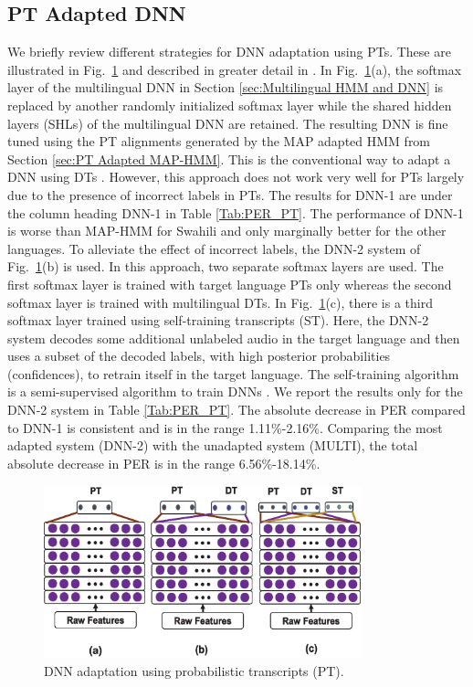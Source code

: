 \documentclass[a4paper]{article}
\newcommand{\myvspacefig}{\vspace{-4mm}}
\begin{document}
\subsection{PT Adapted DNN}
\label{sec:PT Adapted DNN}
We briefly review different strategies for DNN adaptation using PTs. These are illustrated in Fig.~\ref{fig:DNN} and described in greater detail in \cite{Das-PTAdaptedDNN}. In Fig.~\ref{fig:DNN}(a), the softmax layer of the multilingual DNN in Section \ref{sec:Multilingual HMM and DNN} is replaced by another randomly initialized softmax layer while the shared hidden layers (SHLs) of the multilingual DNN are retained. The resulting DNN is fine tuned using the PT alignments generated by the MAP adapted HMM from Section \ref{sec:PT Adapted MAP-HMM}. This is the conventional way to adapt a DNN using DTs \cite{Ghoshal-MultilingualPretraining}. However, this approach does not work very well for PTs largely due to the presence of incorrect labels in PTs. The results for DNN-1 are under the column heading DNN-1 in Table \ref{Tab:PER_PT}. The performance of DNN-1 is worse than MAP-HMM for Swahili and only marginally better for the other languages. To alleviate the effect of incorrect labels, the DNN-2 system of Fig.~\ref{fig:DNN}(b) is used. In this approach, two separate softmax layers are used. The first softmax layer is trained with target language PTs only whereas the second softmax layer is trained with multilingual DTs. In Fig.~\ref{fig:DNN}(c), there is a third softmax layer trained using self-training transcripts (ST). Here, the DNN-2 system decodes some additional unlabeled audio in the target language and then uses a subset of the decoded labels, with high posterior probabilities (confidences), to retrain itself in the target language. The self-training algorithm is a semi-supervised algorithm to train DNNs \cite{Vesely-SemisupTrainingDNN}. We report the results only for the DNN-2 system in Table \ref{Tab:PER_PT}. The absolute decrease in PER compared to DNN-1 is consistent and is in the range 1.11\%-2.16\%. Comparing the most adapted system (DNN-2) with the unadapted system (MULTI), the total absolute decrease in PER is in the range 6.56\%-18.14\%.

\begin{figure}
 \centering
 \includegraphics[width=\linewidth,height=5cm]{fig/DNN_multisoftmax.eps} 
 \myvspacefig
  \caption{DNN adaptation using probabilistic transcripts (PT).}
 \label{fig:DNN}
\end{figure}
\end{document}
